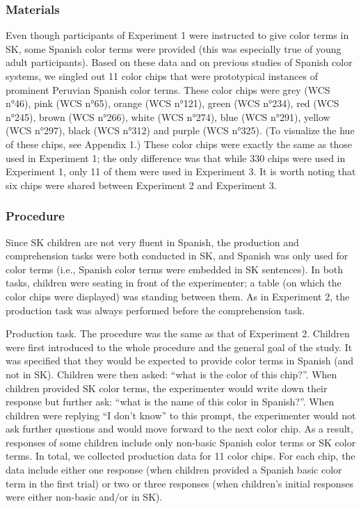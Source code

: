 \documentclass[floatsintext,man]{apa6}
\theoremstyle{definition}
\theoremstyle{definition}
\theoremstyle{definition}
\theoremstyle{remark}
\begin{document}
\subsubsection{Materials}\label{materials-2}

Even though participants of Experiment 1 were instructed to give color
terms in SK, some Spanish color terms were provided (this was especially
true of young adult participants). Based on these data and on previous
studies of Spanish color systems, we singled out 11 color chips that
were prototypical instances of prominent Peruvian Spanish color terms.
These color chips were grey (WCS n°46), pink (WCS n°65), orange (WCS
n°121), green (WCS n°234), red (WCS n°245), brown (WCS n°266), white
(WCS n°274), blue (WCS n°291), yellow (WCS n°297), black (WCS n°312) and
purple (WCS n°325). (To visualize the hue of these chips, see Appendix
1.) These color chips were exactly the same as those used in Experiment
1; the only difference was that while 330 chips were used in Experiment
1, only 11 of them were used in Experiment 3. It is worth noting that
six chips were shared between Experiment 2 and Experiment 3.

\subsubsection{Procedure}\label{procedure-2}

Since SK children are not very fluent in Spanish, the production and
comprehension tasks were both conducted in SK, and Spanish was only used
for color terms (i.e., Spanish color terms were embedded in SK
sentences). In both tasks, children were seating in front of the
experimenter; a table (on which the color chips were displayed) was
standing between them. As in Experiment 2, the production task was
always performed before the comprehension task.

Production task. The procedure was the same as that of Experiment 2.
Children were first introduced to the whole procedure and the general
goal of the study. It was specified that they would be expected to
provide color terms in Spanish (and not in SK). Children were then
asked: \enquote{what is the color of this chip?}. When children provided
SK color terms, the experimenter would write down their response but
further ask: \enquote{what is the name of this color in Spanish?}. When
children were replying \enquote{I don't know} to this prompt, the
experimenter would not ask further questions and would move forward to
the next color chip. As a result, responses of some children include
only non-basic Spanish color terms or SK color terms. In total, we
collected production data for 11 color chips. For each chip, the data
include either one response (when children provided a Spanish basic
color term in the first trial) or two or three responses (when
children's initial responses were either non-basic and/or in SK).
\end{document}

